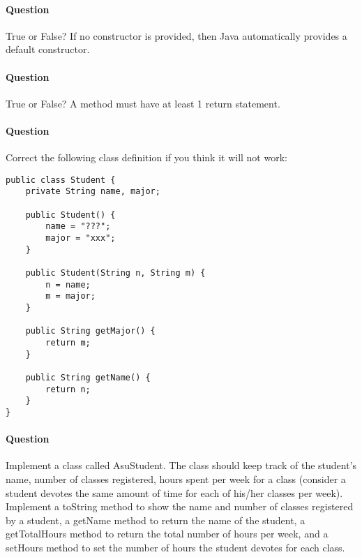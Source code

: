 \documentclass{article}
\begin{document}
\addtocounter{question_num}{1}
\paragraph{Question }
True or False? If no constructor is provided, then Java automatically provides a default constructor.

\addtocounter{question_num}{1}
\paragraph{Question }
True or False? A method must have at least 1 return statement.

\addtocounter{question_num}{1}
\paragraph{Question }
Correct the following class definition if you think it will not work:
\begin{lstlisting}
public class Student {
	private String name, major;

	public Student() {
		name = "???";
		major = "xxx";
	}

	public Student(String n, String m) {
		n = name;
		m = major;
	}

	public String getMajor() {
		return m;
	}

	public String getName() {
		return n;
	}
}
\end{lstlisting}

\addtocounter{question_num}{1}
\paragraph{Question }
Implement a class called AsuStudent. The class should keep track of the student's name, number of classes registered, hours spent per week for a class (consider a student devotes the same amount of time for each of his/her classes per week). Implement a toString method to show the name and number of classes registered by a student, a getName method to return the name of the student, a getTotalHours method to return the total number of hours per week, and a setHours method to set the number of hours the student devotes for each class.
\end{document}
